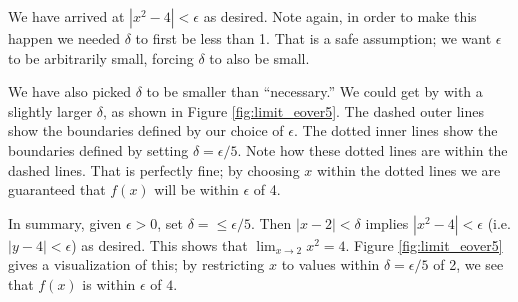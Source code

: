 {We have arrived at $|x^2 - 4|<\epsilon$ as desired.  Note again, in order to make this happen we needed $\delta$ to first be less than 1.  That is a safe assumption; we want $\epsilon$ to be arbitrarily small, forcing $\delta$ to also be small. 

We have also picked $\delta$ to be smaller than ``necessary.'' We could get by with a slightly larger $\delta$, as shown in Figure \ref{fig:limit_eover5}. The dashed outer lines show the boundaries defined by our choice of $\epsilon$. The dotted inner lines show the boundaries defined by setting $\delta = \epsilon/5$. Note how these dotted lines are within the dashed lines. That is perfectly fine; by choosing $x$ within the dotted lines we are guaranteed that $f(x)$ will be within $\epsilon$ of 4.%


In summary, given $\epsilon > 0$, set $\delta=\leq\epsilon/5$.  Then $|x - 2| < \delta$ implies 
$|x^2 - 4|< \epsilon$ (i.e. $|y - 4|< \epsilon$) as desired.  This shows that $\displaystyle \lim_{x\rightarrow 2} x^2 = 4 $. Figure \ref{fig:limit_eover5} gives a visualization of this; by restricting $x$ to values within $\delta = \epsilon/5$ of 2, we see that $f(x)$ is within $\epsilon$ of $4$.
}\\


